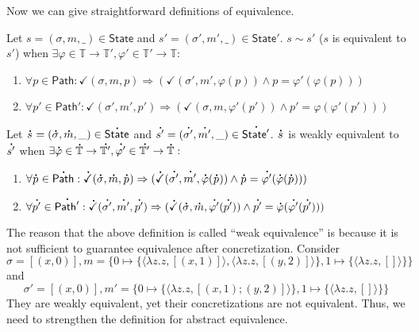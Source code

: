 \documentclass[acmsmall,screen,review]{acmart}\settopmatter{printfolios=true,printccs=false,printacmref=false}
\newcommand*{\A}[1]{\overset{\,_{\mbox{\Large .}}}{#1}}
\newcommand*{\Time}{\mathbb{T}}
\newcommand*{\ATime}{\A{\Time}}
\newcommand*{\ctx}{\sigma}
\newcommand*{\mem}{m}
\newcommand*{\State}{\mathsf{State}}
\newcommand*{\AState}{\A{\mathsf{State}}}
\newcommand*{\valid}{\checkmark}
\newcommand*{\Path}{\mathsf{Path}}
\newcommand*{\equivalent}{\sim}
\begin{document}
Now we can give straightforward definitions of equivalence.
\begin{definition}
  Let $s=(\ctx,\mem,\_)\in\State$ and $s'=(\ctx',\mem',\_)\in\State'$.
  $s\equivalent s'$ ($s$ is equivalent to $s'$) when $\exists\varphi\in\Time\rightarrow\Time',\varphi'\in\Time'\rightarrow\Time:$
  \begin{enumerate}
    \item $\forall p\in\Path:\valid(\ctx,\mem,p)\Rightarrow(\valid(\ctx',\mem',\varphi(p))\land p=\varphi'(\varphi(p)))$
    \item $\forall p'\in\Path':\valid(\ctx',\mem',p')\Rightarrow(\valid(\ctx,\mem,\varphi'(p'))\land p'=\varphi(\varphi'(p')))$
  \end{enumerate}
\end{definition}
\begin{definition}\label{def:weakequiv}
  Let $\A{s}=(\A{\ctx},\A\mem,\_)\in\AState$ and $\A{s'}=(\A{\ctx'},\A{\mem'},\_)\in\A{\State'}$.
  $\A{s}$ is weakly equivalent to $\A{s'}$ when $\exists\A\varphi\in\ATime\rightarrow\A{\Time'},\A{\varphi'}\in\A{\Time'}\rightarrow\A\Time:$
  \begin{enumerate}
    \item $\forall\A{p}\in\A\Path:\A\valid(\A{\ctx},\A\mem,\A{p})\Rightarrow(\A\valid(\A{\ctx'},\A{\mem'},\A\varphi(\A{p}))\land\A{p}=\A{\varphi'}(\A\varphi(\A{p})))$
    \item $\forall\A{p'}\in\A{\Path'}:\A\valid(\A{\ctx'},\A{\mem'},\A{p'})\Rightarrow(\A\valid(\A{\ctx},\A{\mem},\A{\varphi'}(\A{p'}))\land\A{p'}=\A\varphi(\A{\varphi'}(\A{p'})))$
  \end{enumerate}
\end{definition}
The reason that the above definition is called ``weak equivalence'' is because it is not sufficient to guarantee equivalence after concretization.
Consider
\[
  \ctx=[(x,0)],\mem=\{0\mapsto\{\langle\lambda z.z,[(x,1)]\rangle,\langle\lambda z.z,[(y,2)]\rangle\},1\mapsto\{\langle\lambda z.z,[]\rangle\}\}
\]
and
\[
  \ctx'=[(x,0)],\mem'=\{0\mapsto\{\langle\lambda z.z,[(x,1);(y,2)]\rangle\},1\mapsto\{\langle\lambda z.z,[]\rangle\}\}
\]
They are weakly equivalent, yet their concretizations are not equivalent.
Thus, we need to strengthen the definition for abstract equivalence.
\end{document}
